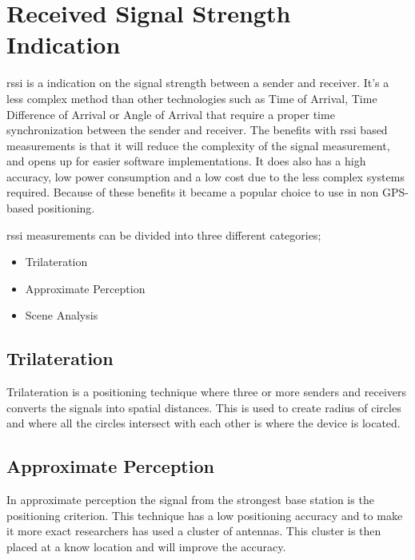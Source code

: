 \section{Received Signal Strength Indication}\label{sec:theoryRssi}
\acrfull{rssi} is a indication on the signal strength between a sender and receiver.
It's a less complex method than other technologies such as Time of Arrival, Time Difference of Arrival or
Angle of Arrival that require a proper time synchronization between the sender and receiver.
The benefits with \acrshort{rssi} based measurements is that it will reduce the complexity of the signal measurement, and opens up for easier software implementations.
It does also has a high accuracy, low power consumption and a low cost due to the less complex systems required.
Because of these benefits it became a popular choice to use in non GPS-based positioning.
\cite{IndoorFingerprintPositioning2017} 

\bigskip

\acrshort{rssi} measurements can be divided into three different categories;

\begin{itemize}
	\item Trilateration
	\item Approximate Perception
	\item Scene Analysis \cite{IndoorFingerprintPositioning2017}
\end{itemize}

\subsection{Trilateration}\label{sec:theoryRssiTrilateration} Trilateration
is a positioning technique where three or more senders and receivers converts the signals
into spatial distances.  This is used to create radius of circles and where all
the circles intersect with each other is where the device is located.
\cite{IndoorFingerprintPositioning2017} 

\subsection{Approximate Perception}\label{sec:theoryRssiApproxPerception} In
approximate perception the signal from the strongest base station is the
positioning criterion.  This technique has a low positioning accuracy and to
make it more exact researchers has used a cluster of antennas.  This cluster is
then placed at a know location and will improve the
accuracy.\cite{IndoorFingerprintPositioning2017} 

